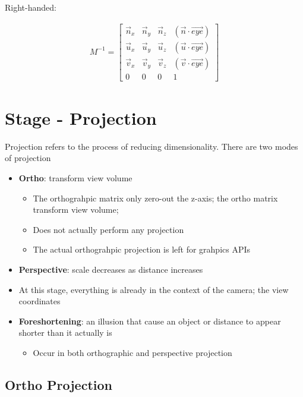   Right-handed:

  \begin{align}
    M^{-1} =
    \begin{bmatrix}
      \vec{n}_{x} & \vec{n}_{y} & \vec{n}_{z} & \left( \vec{n} \cdot \vec{eye} \right) \\
      \vec{u}_{x} & \vec{u}_{y} & \vec{u}_{z} & \left( \vec{u} \cdot \vec{eye} \right) \\
      \vec{v}_{x} & \vec{v}_{y} & \vec{v}_{z} & \left( \vec{v} \cdot \vec{eye} \right) \\
      0 & 0 & 0 & 1
    \end{bmatrix}
  \end{align}

\section{Stage - Projection}

  Projection refers to the process of reducing dimensionality. There are two
  modes of projection

  \begin{itemize}
    \item \textbf{Ortho}: transform view volume
    \begin{itemize}
      \item The orthograhpic matrix only zero-out the z-axis; the ortho matrix
      transform view volume;
      \item Does not actually perform any projection
      \item The actual orthograhpic projection is left for grahpics APIs
    \end{itemize}

    \item \textbf{Perspective}: scale decreases as distance increases
    \item At this stage, everything is already in the context of the camera;
    the view coordinates
    \item \textbf{Foreshortening}: an illusion that cause an object or distance
    to appear shorter than it actually is
    \begin{itemize}
      \item Occur in both orthographic and perspective projection
    \end{itemize}
  \end{itemize}

  \subsection{Ortho Projection}

